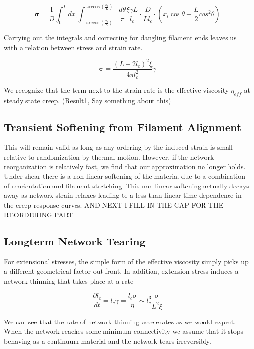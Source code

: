 \documentclass[pre,preprint]{revtex4-1}
\begin{document}
\begin{equation}
\mathbf{\sigma} =  \frac{1}{D} \int_0^L dx_l \int_{-\arccos (\frac{x_l}{L})}^{\arccos (\frac{x_l}{L})}\frac{d\theta}{\pi} \frac{\xi \dot \gamma L}{l_c} \cdot \frac{D}{Ll_c}\cdot (x_l \cos \theta + \frac{L}{2} cos^2\theta)
\end{equation}

Carrying out the integrals and correcting for dangling filament ends leaves us with a relation between stress and strain rate.

\begin{equation}
\mathbf{\sigma} = \frac{(L-2l_c)^2 \xi}{4\pi l_c^2} \dot \gamma \end{equation}

We recognize that the term next to the strain rate is the effective viscosity $\eta_{eff}$ at steady state creep.  (Result1, Say something about this)

\subsection{Transient Softening from Filament Alignment}

This will remain valid as long as any ordering by the induced strain is small relative to randomization by thermal motion.  However, if the network reorganization is relatively fast, we find that our approximation no longer holds.  Under shear there is a non-linear softening of the material due to a combination of reorientation and filament stretching.  This non-linear softening actually decays away as network strain relaxes leading to a less than linear time dependence in the creep response curves.  AND NEXT I FILL IN THE GAP FOR THE REORDERING PART

\subsection{Longterm Network Tearing}

For extensional stresses, the simple form of the effective viscosity simply picks up a different geometrical factor out front.  In addition, extension stress induces a network thinning that takes place at a rate  

\begin{equation}
\frac{\partial l_c}{dt}=l_c\dot \gamma =\frac{l_c \sigma}{\eta}\sim l_c^3\frac{ \sigma}{L^2 \xi}
\end{equation}

We can see that the rate of network thinning accelerates as we would expect.  When the network reaches some minimum connectivity we assume that it stops behaving as a continuum material and the network tears irreversibly.  
\end{document}
